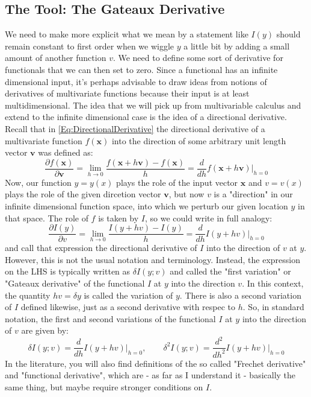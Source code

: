 \subsection{The Tool: The Gateaux Derivative}
We need to make more explicit what we mean by a statement like $I(y)$ should remain constant to first order when we wiggle $y$ a little bit by adding a small amount of another function $v$. We need to define some sort of derivative for functionals that we can then set to zero. Since a functional has an infinite dimensional input, it's perhaps advisable to draw ideas from notions of derivatives of multivariate functions because their input is at least multidimensional. The idea that we will pick up from multivariable calculus and extend to the infinite dimensional case is the idea of a directional derivative. Recall that in \ref{Eq:DirectionalDerivative} the directional derivative of a multivariate function $f(\mathbf{x})$ into the direction of some arbitrary unit length vector $\mathbf{v}$ was defined as:
\begin{equation}
 \frac{\partial f(\mathbf{x}) }{\partial \mathbf{v}} 
 = \lim_{h \rightarrow 0} \frac{f(\mathbf{x} + h \mathbf{v} ) - f(\mathbf{x})}{h}
 = \frac{d}{d h} f(\mathbf{x} + h \mathbf{v}) \bigg\rvert_{h=0}
\end{equation}
Now, our function $y = y(x)$ plays the role of the input vector $\mathbf{x}$ and $v = v(x)$ plays the role of  the given dircetion vector $\mathbf{v}$, but now $v$ is a "direction" in our infinite dimensional function space, into which we perturb our given location $y$ in that space. The role of $f$ is taken by $I$, so we could write in full analogy:
\begin{equation}
 \frac{\partial I(y) }{\partial v} 
 = \lim_{h \rightarrow 0} \frac{I(y + h v ) - I(y)}{h}
 = \frac{d}{d h} I(y + h v) \bigg\rvert_{h=0}
\end{equation}
and call that expression the directional derivative of $I$ into the direction of $v$ at $y$. However, this is not the usual notation and terminology. Instead, the expression on the LHS is typically written as $\delta I(y;v)$ and called the "first variation" or  "Gateaux derivative" of the functional $I$ at $y$ into the direction $v$. In this context, the quantity $h v = \delta y$ is called the variation of $y$. There is also a second variation of $I$ defined likewise, just as a second derivative with respec to $h$. So, in standard notation, the first and second variations of the functional $I$ at $y$ into the direction of $v$ are given by:
\begin{equation}
 \delta   I(y; v) = \frac{d}  {d h  } I(y + h v) \bigg\rvert_{h=0}, \qquad
 \delta^2 I(y; v) = \frac{d^2}{d h^2} I(y + h v) \bigg\rvert_{h=0}
\end{equation}
In the literature, you will also find definitions of the so called "Frechet derivative" and "functional derivative", which are - as far as I understand it - basically the same thing, but maybe require stronger conditions on $I$.

